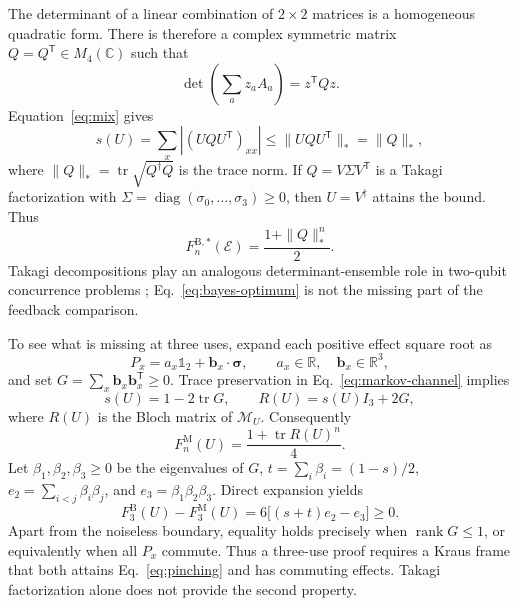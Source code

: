 \documentclass[11pt]{article}
\theoremstyle{remark}
\newcommand{\cE}{\mathcal{E}}
\newcommand{\cM}{\mathcal{M}}
\newcommand{\Tr}{\operatorname{tr}}
\newcommand{\rank}{\operatorname{rank}}
\newcommand{\R}{\mathbb{R}}
\newcommand{\C}{\mathbb{C}}
\newcommand{\one}{\mathbb{1}}
\begin{document}
The determinant of a linear combination of $2\times2$ matrices is a
homogeneous quadratic form.  There is therefore a complex symmetric matrix
$Q=Q^{\mathsf T}\in M_4(\C)$ such that
\begin{equation}
  \det\!\left(\sum_a z_aA_a\right)=z^{\mathsf T}Qz .
  \label{eq:q-def}
\end{equation}
Equation~\eqref{eq:mix} gives
\begin{equation}
  s(U)=\sum_x |(UQU^{\mathsf T})_{xx}|
  \leq \|UQU^{\mathsf T}\|_*=\|Q\|_* ,
  \label{eq:pinching}
\end{equation}
where $\|Q\|_*=\Tr\sqrt{Q^\dagger Q}$ is the trace norm.  If
$Q=V\Sigma V^{\mathsf T}$ is a Takagi factorization with
$\Sigma=\operatorname{diag}(\sigma_0,\ldots,\sigma_3)\geq0$, then
$U=V^\dagger$ attains the bound.  Thus
\begin{equation}
 F^{\mathrm B,*}_n(\cE)=\frac{1+\|Q\|_*^n}{2}.
 \label{eq:bayes-optimum}
\end{equation}
Takagi decompositions play an analogous determinant-ensemble role in
two-qubit concurrence problems \cite{laustsen2003}; Eq.~\eqref{eq:bayes-optimum}
is not the missing part of the feedback comparison.

To see what is missing at three uses, expand each positive effect square root
as
\begin{equation}
  P_x=a_x\one_2+\bm b_x\cdot\bm\sigma,
  \qquad a_x\in\R,\quad \bm b_x\in\R^3,
\end{equation}
and set $G=\sum_x\bm b_x\bm b_x^{\mathsf T}\geq0$.  Trace preservation in
Eq.~\eqref{eq:markov-channel} implies
\begin{equation}
  s(U)=1-2\Tr G,
  \qquad R(U)=s(U)I_3+2G,
  \label{eq:bloch-map}
\end{equation}
where $R(U)$ is the Bloch matrix of $\cM_U$.  Consequently
\begin{equation}
  F^{\mathrm M}_n(U)=\frac{1+\Tr R(U)^n}{4}.
  \label{eq:markov-bloch}
\end{equation}
Let $\beta_1,\beta_2,\beta_3\geq0$ be the eigenvalues of $G$,
$t=\sum_i\beta_i=(1-s)/2$,
$e_2=\sum_{i<j}\beta_i\beta_j$, and
$e_3=\beta_1\beta_2\beta_3$.  Direct expansion yields
\begin{equation}
 F^{\mathrm B}_3(U)-F^{\mathrm M}_3(U)
 =6\big[(s+t)e_2-e_3\big]\geq0.
 \label{eq:three-deficit}
\end{equation}
Apart from the noiseless boundary, equality holds precisely when
$\rank G\leq1$, or equivalently when all $P_x$ commute.  Thus a three-use
proof requires a Kraus frame that both attains Eq.~\eqref{eq:pinching} and has
commuting effects.  Takagi factorization alone does not provide the second
property.
\end{document}
